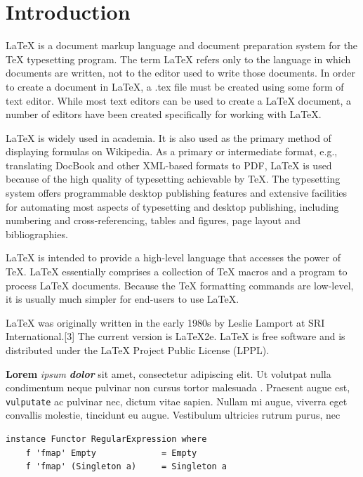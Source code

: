 \section{Introduction}\label{introduction}

LaTeX is a document markup language and document preparation system for
the TeX typesetting program. The term LaTeX refers only to the language
in which documents are written, not to the editor used to write those
documents. In order to create a document in LaTeX, a .tex file must be
created using some form of text editor. While most text editors can be
used to create a LaTeX document, a number of editors have been created
specifically for working with LaTeX.

LaTeX is widely used in academia. It is also used as the primary method
of displaying formulas on Wikipedia. As a primary or intermediate
format, e.g., translating DocBook and other XML-based formats to PDF,
LaTeX is used because of the high quality of typesetting achievable by
TeX. The typesetting system offers programmable desktop publishing
features and extensive facilities for automating most aspects of
typesetting and desktop publishing, including numbering and
cross-referencing, tables and figures, page layout and bibliographies.

LaTeX is intended to provide a high-level language that accesses the
power of TeX. LaTeX essentially comprises a collection of TeX macros and
a program to process LaTeX documents. Because the TeX formatting
commands are low-level, it is usually much simpler for end-users to use
LaTeX.

LaTeX was originally written in the early 1980s by Leslie Lamport at SRI
International.{[}3{]} The current version is LaTeX2e. LaTeX is free
software and is distributed under the LaTeX Project Public License
(LPPL).

\textbf{Lorem} \emph{ipsum} \textbf{\emph{dolor}} sit amet, consectetur
adipiscing elit. Ut volutpat nulla condimentum neque pulvinar non cursus
tortor malesuada \citep{halevy2009unreasonable}. Praesent augue est,
\texttt{vulputate} ac pulvinar nec, dictum vitae sapien. Nullam mi
augue, viverra eget convallis molestie, tincidunt eu augue. Vestibulum
ultricies rutrum purus, nec

\begin{minipage}{0.95\textwidth}\begin{lstlisting}
instance Functor RegularExpression where
    f 'fmap' Empty             = Empty
    f 'fmap' (Singleton a)     = Singleton a
\end{lstlisting}\end{minipage}

